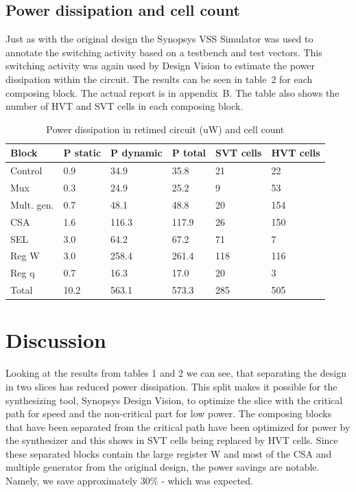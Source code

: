 \documentclass[11pt,a4paper]{article}
\begin{document}
\FloatBarrier
\subsection{Power dissipation and cell count}

Just as with the original design the Synopsys VSS Simulator was used to annotate the switching activity based on a testbench and test vectors. This switching activity was again used by Design Vision to estimate the power dissipation within the circuit. The results can be seen in table~2 for each composing block. The actual report is in appendix~B. The table also shows the number of HVT and SVT cells in each composing block.

\begin{table}[h]
\caption{Power dissipation in retimed circuit (uW) and cell count}
\begin{center}
\begin{tabular}{|l|l|l|l|l|l|} %
\hline
\textbf{Block}	& \textbf{P static}		& \textbf{P dynamic}	& \textbf{P total} & \textbf{SVT cells} & \textbf{HVT cells}\\ \hline
Control & 0.9 & 34.9 & 35.8 & 21 & 22 \\ \hline
Mux & 0.3 & 24.9 & 25.2 & 9 & 53 	\\ \hline
Mult. gen. & 0.7 & 48.1 & 48.8 & 20 & 154 	\\ \hline
CSA & 1.6 & 116.3 & 117.9 & 26 & 150 	\\ \hline
SEL & 3.0 & 64.2 & 67.2 & 71 & 7 	\\ \hline
Reg W & 3.0 & 258.4 & 261.4 & 118 & 116 	\\ \hline
Reg q & 0.7 & 16.3 & 17.0 & 20 & 3 \\ \hline \hline
Total & 10.2 & 563.1 & 573.3 & 285 & 505 \\ \hline
\end{tabular}
\end{center}
\label{table:powerRetimed}
\end{table}
\FloatBarrier

\section{Discussion}
Looking at the results from tables 1 and 2 we can see, that separating the design in two slices has reduced power dissipation. This split makes it possible for the synthesizing tool, Synopsys Design Vision, to optimize the slice with the critical path for speed and the non-critical part for low power. The composing blocks that have been separated from the critical path have been optimized for power by the synthesizer and this shows in SVT cells being replaced by HVT cells. Since these separated blocks contain the large register W and most of the CSA and multiple generator from the original design, the power savings are notable. Namely, we save approximately 30\% - which was expected.
\end{document}
